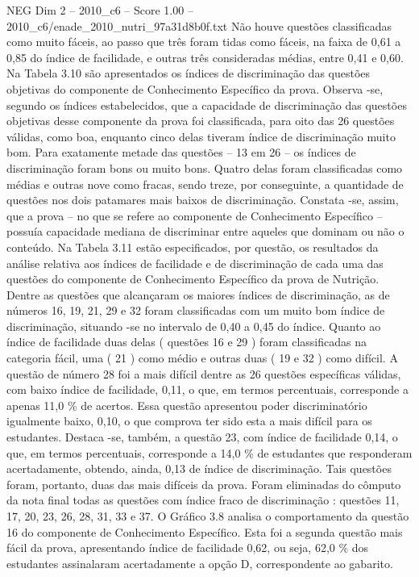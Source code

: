 \begin{textsample}{NEG Dim 2 – 2010\_c6 – Score 1.00 – 2010\_c6/enade\_2010\_nutri\_97a31d8b0f.txt}
Não houve questões classificadas como muito fáceis, ao passo que três foram tidas como fáceis, na faixa de 0,61 a 0,85 do índice de facilidade, e outras três consideradas médias, entre 0,41 e 0,60.
Na Tabela 3.10 são apresentados os índices de discriminação das questões objetivas do componente de Conhecimento Específico da prova.
Observa -se, segundo os índices estabelecidos, que a capacidade de discriminação das questões objetivas desse componente da prova foi classificada, para oito das 26 questões válidas, como boa, enquanto cinco delas tiveram índice de discriminação muito bom.
Para exatamente metade das questões – 13 em 26 – os índices de discriminação foram bons ou muito bons.
Quatro delas foram classificadas como médias e outras nove como fracas, sendo treze, por conseguinte, a quantidade de questões nos dois patamares mais baixos de discriminação.
Constata -se, assim, que a prova – no que se refere ao componente de Conhecimento Específico – possuía capacidade mediana de discriminar entre aqueles que dominam ou não o conteúdo.
Na Tabela 3.11 estão especificados, por questão, os resultados da análise relativa aos índices de facilidade e de discriminação de cada uma das questões do componente de Conhecimento Específico da prova de Nutrição.
Dentre as questões que alcançaram os maiores índices de discriminação, as de números 16, 19, 21, 29 e 32 foram classificadas com um muito bom índice de discriminação, situando -se no intervalo de 0,40 a 0,45 do índice.
Quanto ao índice de facilidade duas delas ( questões 16 e 29 ) foram classificadas na categoria fácil, uma ( 21 ) como médio e outras duas ( 19 e 32 ) como difícil.
A questão de número 28 foi a mais difícil dentre as 26 questões específicas válidas, com baixo índice de facilidade, 0,11, o que, em termos percentuais, corresponde a apenas 11,0 \% de acertos.
Essa questão apresentou poder discriminatório igualmente baixo, 0,10, o que comprova ter sido esta a mais difícil para os estudantes.
Destaca -se, também, a questão 23, com índice de facilidade 0,14, o que, em termos percentuais, corresponde a 14,0 \% de estudantes que responderam acertadamente, obtendo, ainda, 0,13 de índice de discriminação.
Tais questões foram, portanto, duas das mais difíceis da prova.
Foram eliminadas do cômputo da nota final todas as questões com índice fraco de discriminação : questões 11, 17, 20, 23, 26, 28, 31, 33 e 37.
O Gráfico 3.8 analisa o comportamento da questão 16 do componente de Conhecimento Específico.
Esta foi a segunda questão mais fácil da prova, apresentando índice de facilidade 0,62, ou seja, 62,0 \% dos estudantes assinalaram acertadamente a opção D, correspondente ao gabarito.

\end{textsample}
